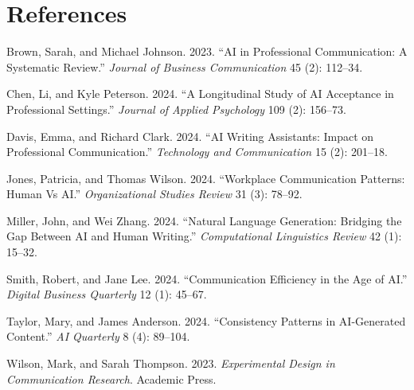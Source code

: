 \documentclass[
]{article}
\newlength{\cslhangindent}
\newenvironment{CSLReferences}[2] %
 {\begin{list}{}{%
  \setlength{\itemindent}{0pt}
  \setlength{\leftmargin}{0pt}
  \setlength{\parsep}{0pt}
  \ifodd #1
   \setlength{\leftmargin}{\cslhangindent}
   \setlength{\itemindent}{-1\cslhangindent}
  \fi
  \setlength{\itemsep}{#2\baselineskip}}}
 {\end{list}}
\begin{document}
\section*{References}\label{references}

\label{refs}
\begin{CSLReferences}{1}{0}
Brown, Sarah, and Michael Johnson. 2023. {``AI in Professional
Communication: A Systematic Review.''} \emph{Journal of Business
Communication} 45 (2): 112--34.

Chen, Li, and Kyle Peterson. 2024. {``A Longitudinal Study of AI
Acceptance in Professional Settings.''} \emph{Journal of Applied
Psychology} 109 (2): 156--73.

Davis, Emma, and Richard Clark. 2024. {``AI Writing Assistants: Impact
on Professional Communication.''} \emph{Technology and Communication} 15
(2): 201--18.

Jones, Patricia, and Thomas Wilson. 2024. {``Workplace Communication
Patterns: Human Vs AI.''} \emph{Organizational Studies Review} 31 (3):
78--92.

Miller, John, and Wei Zhang. 2024. {``Natural Language Generation:
Bridging the Gap Between AI and Human Writing.''} \emph{Computational
Linguistics Review} 42 (1): 15--32.

Smith, Robert, and Jane Lee. 2024. {``Communication Efficiency in the
Age of AI.''} \emph{Digital Business Quarterly} 12 (1): 45--67.

Taylor, Mary, and James Anderson. 2024. {``Consistency Patterns in
AI-Generated Content.''} \emph{AI Quarterly} 8 (4): 89--104.

Wilson, Mark, and Sarah Thompson. 2023. \emph{Experimental Design in
Communication Research}. Academic Press.

\end{CSLReferences}
\end{document}
